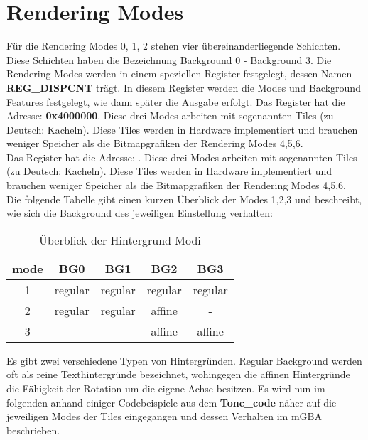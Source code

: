 \chapter{Rendering Modes}
Für die Rendering Modes 0, 1, 2 stehen vier übereinanderliegende Schichten. Diese Schichten haben die Bezeichnung Background 0 - Background 3.
Die Rendering Modes werden in einem speziellen Register festgelegt, dessen Namen \textbf{REG\_DISPCNT} trägt. In diesem Register werden die Modes und Background Features festgelegt, wie dann später die Ausgabe erfolgt.
Das Register hat die Adresse: \textbf{0x4000000}. Diese drei Modes arbeiten mit sogenannten Tiles (zu Deutsch: Kacheln). Diese Tiles werden in Hardware implementiert und brauchen weniger Speicher als die Bitmapgrafiken der Rendering Modes 4,5,6.\\
Das Register hat die Adresse: . Diese drei Modes arbeiten mit sogenannten Tiles (zu Deutsch: Kacheln). Diese Tiles werden in Hardware implementiert und brauchen weniger Speicher als die Bitmapgrafiken der Rendering Modes 4,5,6.\\
Die folgende Tabelle gibt einen kurzen Überblick der Modes 1,2,3 und beschreibt, wie sich die Background des jeweiligen Einstellung verhalten: \\
\begin{table}[h]
\centering
\begin{tabular}{|c|c|c|c|c|}
\hline
\textbf{mode} & \textbf{BG0} & \textbf{BG1} & \textbf{BG2} & \textbf{BG3} \\ \hline
1 & regular & regular & regular & regular \\ \hline
2 & regular & regular & affine & - \\ \hline
3 & - & - & affine & affine \\ \hline
\end{tabular}
\caption{Überblick der Hintergrund-Modi}
\label{Überblick der Hintergrund-Modi}
\end{table}
Es gibt zwei verschiedene Typen von Hintergründen. Regular Background werden oft als reine Texthintergründe bezeichnet, wohingegen die affinen Hintergründe die Fähigkeit der Rotation um die eigene Achse besitzen.
Es wird nun im folgenden anhand einiger Codebeispiele aus dem \textbf{Tonc\_code} näher auf die jeweiligen Modes der Tiles eingegangen und dessen Verhalten im mGBA beschrieben.